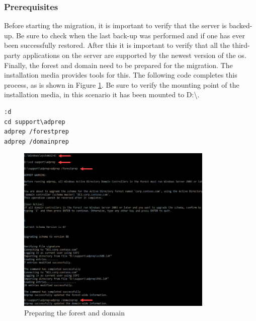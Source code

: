 \subsubsection{Prerequisites}
Before starting the migration, it is important to verify that the server is backed-up. Be sure to check when the last back-up was performed and if one has ever been successfully restored. After this it is important to verify that all the third-party applications on the server are supported by the newest version of the \acrshort{os}. Finally, the forest and domain need to be prepared for the migration. The installation media provides tools for this. The following code completes this process, as is shown in Figure \ref{fig:inplace1}. Be sure to verify the mounting point of the installation media, in this scenario it has been mounted to D:\textbackslash .

\begin{lstlisting}[breaklines]
:d
cd support\adprep
adprep /forestprep
adprep /domainprep
\end{lstlisting}
\begin{figure}[h]
	\includegraphics[height=8cm]{img/Methodologie/Prerequisites0.png}
	\captionsetup{width=0.8\linewidth}
	\centering		
	\caption{Preparing the forest and domain}
	\label{fig:inplace1}
\end{figure}

